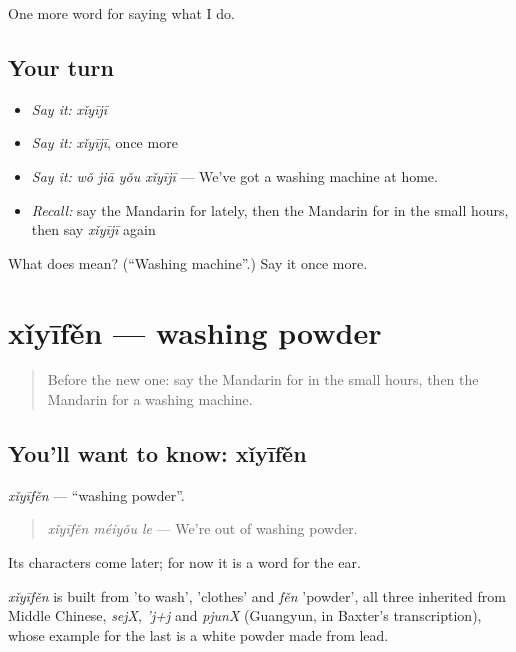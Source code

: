 \begin{grammarlens}[title={What you've built}]
One more word for saying what I do.
\end{grammarlens}

\subsection*{Your turn}
\begin{itemize}
\raggedright
  \item \emph{Say it:} \emph{xǐyījī}
  \item \emph{Say it:} \emph{xǐyījī}, once more
  \item \emph{Say it:} \emph{wǒ jiā yǒu xǐyījī} — We've got a washing machine at home.
  \item \emph{Recall:} say the Mandarin for lately, then the Mandarin for in the small hours, then say \emph{xǐyījī} again
\end{itemize}

\begin{tcolorbox}[breakable,colback=teal!4,colframe=teal!35!black,title={Before you move on}]
What does  mean? (\textquotedblleft{}Washing machine\textquotedblright{}.) Say it once more.
\end{tcolorbox}
\section[xǐyīfěn]{xǐyīfěn — washing powder}

\label{lesson:ZH-C179-xiyifen}



\begin{quote}
Before the new one: say the Mandarin for in the small hours, then the Mandarin for a washing machine.
\end{quote}

\subsection*{You'll want to know: xǐyīfěn}
\emph{xǐyīfěn} — \textquotedblleft{}washing powder\textquotedblright{}.

\begin{quote}
\emph{xǐyīfěn méiyǒu le} — We're out of washing powder.
\end{quote}

Its characters come later; for now it is a word for the ear.

\begin{cousinweb}
\emph{xǐyīfěn} is built from  'to wash',  'clothes' and \emph{fěn} 'powder', all three inherited from Middle Chinese, \emph{sejX}, \emph{'j+j} and \emph{pjunX} (Guangyun, in Baxter's transcription), whose example for the last is a white powder made from lead.
\end{cousinweb}

